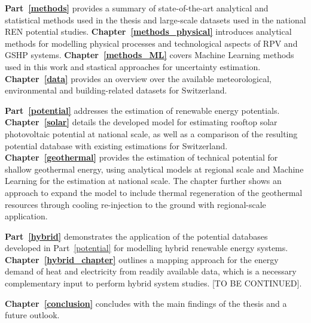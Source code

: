 \textbf{Part~\ref{methods}} provides a summary of state-of-the-art analytical and statistical methods used in the thesis and large-scale datasets used in the national REN potential studies. \textbf{Chapter~\ref{methods_physical}} introduces analytical methods for modelling physical processes and technological aspects of RPV and GSHP systems. \textbf{Chapter~\ref{methods_ML}} covers Machine Learning methods used in this work and stastical approaches for uncertainty estimation.  \textbf{Chapter~\ref{data}} provides an overview over the available meteorological, environmental and building-related datasets for Switzerland.

\textbf{Part~\ref{potential} }addresses the estimation of renewable energy potentials. \textbf{Chapter~\ref{solar} } details the developed model for estimating rooftop solar photovoltaic potential at national scale, as well as a  comparison of the resulting potential database with existing estimations for Switzerland. \textbf{Chapter~\ref{geothermal}} provides the estimation of technical potential for shallow geothermal energy, using analytical models at regional scale and Machine Learning for the estimation at national scale. The chapter further shows an approach to expand the model to include thermal regeneration of the geothermal resources through cooling re-injection to the ground with regional-scale application.

\textbf{Part~\ref{hybrid}} demonstrates the application of the potential databases developed in Part~\ref{potential} for modelling hybrid renewable energy systems. \textbf{Chapter~\ref{hybrid_chapter}} outlines a mapping approach for the energy demand of heat and electricity from readily available data, which is a necessary complementary input to perform hybrid system studies. [TO BE CONTINUED].

\textbf{Chapter~\ref{conclusion}} concludes with the main findings of the thesis and a future outlook.



